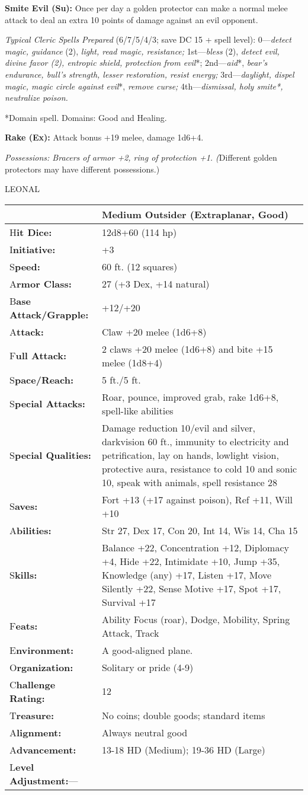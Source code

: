 \documentclass{article}
\begin{document}
\textbf{Smite Evil (Su): }Once per day a golden protector can make a normal melee 
attack to deal an extra 10 points of damage against an evil opponent.

\textit{Typical Cleric Spells Prepared }(6/7/5/4/3; save DC 15 + spell level): 
0---\textit{detect magic, guidance }(2), \textit{light, read magic, resistance; 
}1st---\textit{bless }(2), \textit{detect evil, divine favor (2), entropic shield, 
protection from evil}*; 2nd---\textit{aid}*, \textit{bear's endurance, bull's strength, 
lesser restoration, resist energy; }3rd---\textit{daylight, dispel magic, magic 
circle against evil}*, \textit{remove curse; }4th---\textit{dismissal, holy smite*, 
neutralize poison.}

*Domain spell. Domains: Good and Healing.

\textbf{Rake (Ex): }Attack bonus +19 melee, damage 1d6+4. 

\textit{Possessions: Bracers of armor +2, ring of protection +1. (}Different golden 
protectors may have different possessions.)

\vspace{12pt}
{\LARGE{}LEONAL}

\begin{tabular}{|>{\raggedright}p{91pt}|>{\raggedright}p{234pt}|}
\hline
  & Medium Outsider (Extraplanar, Good)\tabularnewline
\hline
H\textbf{it Dice:} & 12d8+60 (114 hp)\tabularnewline
\hline
I\textbf{nitiative:} & +3\tabularnewline
\hline
S\textbf{peed:} & 60 ft. (12 squares)\tabularnewline
\hline
A\textbf{rmor Class:} & 27 (+3 Dex, +14 natural)\tabularnewline
\hline
B\textbf{ase Attack/Grapple:} & +12/+20\tabularnewline
\hline
A\textbf{ttack:} & Claw +20 melee (1d6+8)\tabularnewline
\hline
F\textbf{ull Attack:} & 2 claws +20 melee (1d6+8) and bite +15 melee (1d8+4)\tabularnewline
\hline
S\textbf{pace/Reach:} & 5 ft./5 ft.\tabularnewline
\hline
S\textbf{pecial Attacks:} & Roar, pounce, improved grab, rake 1d6+8, spell-like 
abilities\tabularnewline
\hline
S\textbf{pecial Qualities:} & Damage reduction 10/evil and silver, darkvision 60 
ft., immunity to electricity and petrification, lay on hands, lowlight vision, 
protective aura, resistance to cold 10 and sonic 10, speak with animals, spell 
resistance 28\tabularnewline
\hline
S\textbf{aves:} & Fort +13 (+17 against poison), Ref +11, Will +10\tabularnewline
\hline
A\textbf{bilities:} & Str 27, Dex 17, Con 20, Int 14, Wis 14, Cha 15\tabularnewline
\hline
S\textbf{kills:} & Balance +22, Concentration +12, Diplomacy +4, Hide +22, Intimidate 
+10, Jump +35, Knowledge (any) +17, Listen +17, Move Silently +22, Sense Motive 
+17, Spot +17, Survival +17 \tabularnewline
\hline
F\textbf{eats:} & Ability Focus (roar), Dodge, Mobility, Spring Attack, Track \tabularnewline
\hline
E\textbf{nvironment:} & A good-aligned plane.\tabularnewline
\hline
O\textbf{rganization:} & Solitary or pride (4-9)\tabularnewline
\hline
C\textbf{hallenge Rating:} & 12\tabularnewline
\hline
T\textbf{reasure:} & No coins; double goods; standard items\tabularnewline
\hline
A\textbf{lignment:} & Always neutral good\tabularnewline
\hline
A\textbf{dvancement:} & 13-18 HD (Medium); 19-36 HD (Large)\tabularnewline
\hline
L\textbf{evel Adjustment:}--- & \tabularnewline
\hline
\end{tabular}
\end{document}
